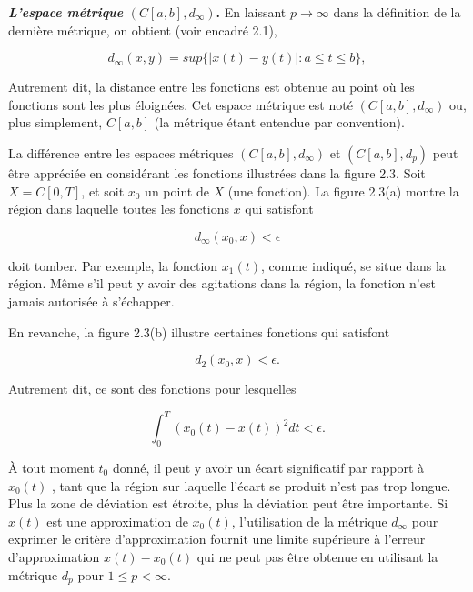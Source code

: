 \documentclass[11pt,twoside,a4paper]{article}
\begin{document}
\textbf{\textit{L'espace métrique} $(C[a, b], d_\infty)$.} En laissant $p \longrightarrow \infty$ dans la définition de la dernière métrique, on obtient (voir encadré 2.1),

\begin{equation}
  d_\infty(x, y) = sup\{|x(t) - y(t)| : a \leq t \leq b\} ,
\end{equation}

Autrement dit, la distance entre les fonctions est obtenue au point où les fonctions sont les plus éloignées. Cet espace métrique est noté $(C[a, b], d_\infty)$ ou, plus simplement, $C[a, b]$ (la métrique étant entendue par convention).

La différence entre les espaces métriques $(C[a, b], d_\infty)$ et $(C[a, b], d_p)$ peut être appréciée en considérant les fonctions illustrées dans la figure 2.3. Soit $X = C[0, T]$, et soit $x_0$ un point de $X$ (une fonction). 
La figure 2.3(a) montre la région dans laquelle toutes les fonctions $x$ qui satisfont

\begin{equation*}
  d_\infty(x_0, x) < \epsilon
\end{equation*}


doit tomber. Par exemple, la fonction $x_1(t)$, comme indiqué, se situe dans la région. Même s'il peut y avoir des agitations dans la région, la fonction n'est jamais autorisée à s'échapper.

En revanche, la figure 2.3(b) illustre certaines fonctions qui satisfont

\begin{equation*}
  d_2(x_0, x) < \epsilon.
\end{equation*}

Autrement dit, ce sont des fonctions pour lesquelles

\begin{equation*}
  \int_{0}^{T} (x_0(t) - x(t))^2 dt < \epsilon.
\end{equation*}

À tout moment $t_0$ donné, il peut y avoir un écart significatif par rapport à $x_0(t)$ , tant que la région sur laquelle l'écart se produit n'est pas trop longue. Plus la zone de déviation est étroite, plus la déviation peut être importante. 
Si $x(t)$ est une approximation de $x_0(t)$, l'utilisation de la métrique $d_\infty$ pour exprimer le critère d'approximation fournit une limite supérieure à l'erreur d'approximation $x(t) - x_0(t)$ qui ne peut pas être obtenue en utilisant la métrique $d_p$ pour $1 \leq p < \infty$.
\end{document}
